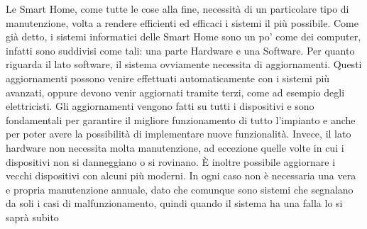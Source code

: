 Le Smart Home, come tutte le cose alla fine, necessità di un particolare tipo di manutenzione, volta a rendere efficienti ed efficaci i sistemi il più possibile. 
Come già detto, i sistemi informatici delle Smart Home sono un po’ come dei computer, infatti sono suddivisi come tali: una parte Hardware e una Software.
Per quanto riguarda il lato software, il sistema ovviamente necessita di aggiornamenti. Questi aggiornamenti possono venire effettuati automaticamente con i sistemi più avanzati, oppure devono venir aggiornati tramite terzi, come ad esempio degli elettricisti. Gli aggiornamenti vengono fatti su tutti i dispositivi e sono fondamentali per garantire il migliore funzionamento di tutto l’impianto e anche per poter avere la possibilità di implementare nuove funzionalità.
Invece, il lato hardware non necessita molta manutenzione, ad eccezione quelle volte in cui i dispositivi non si danneggiano o si rovinano. È inoltre possibile aggiornare i vecchi dispositivi con alcuni più moderni. 
In ogni caso non è necessaria una vera e propria manutenzione annuale, dato che comunque sono sistemi che segnalano da soli i casi di malfunzionamento, quindi quando il sistema ha una falla lo si saprà subito
